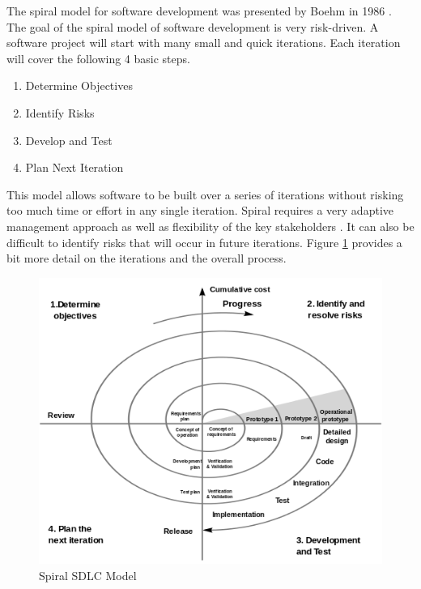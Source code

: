 \documentclass[SDSUThesis.tex]{subfiles}
\begin{document}
        The spiral model for software development was presented by Boehm in 1986
        \cite{Boehm1986, Boehm1988}. 
        The goal of the spiral model of software development is very risk-driven.
        A software project will start with many small and quick iterations. 
        Each iteration will cover the following 4 basic steps. 
        \begin{enumerate}
            \item Determine Objectives
            \item Identify Risks
            \item Develop and Test
            \item Plan Next Iteration
        \end{enumerate}
        This model allows software to be built over a series of iterations
        without risking too much time or effort in any single iteration.
        Spiral requires a very adaptive management approach
        as well as flexibility of the key stakeholders \cite{Ruparelia2010}.
        It can also be difficult to identify risks that will occur in future
        iterations.
        Figure \ref{fig:spiral} provides a bit more detail on the iterations
        and the overall process. 
        \begin{figure}[ht]
            \centering
            \includegraphics[scale=.8]{images/spiral_model.png}
            \caption[SPIRAL SDLC MODEL]{Spiral SDLC Model \cite{Boehm2000} }
            \label{fig:spiral}
        \end{figure}
        
\end{document}
